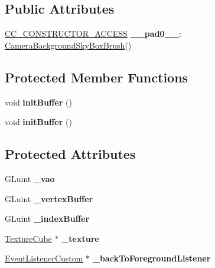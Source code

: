 \subsection*{Public Attributes}
\begin{DoxyCompactItemize}
\item 
\mbox{\label{classCameraBackgroundSkyBoxBrush_a05aff0d9ce05cd735e4830a7f6384987}} 
\hyperlink{_2cocos2d_2cocos_2base_2ccConfig_8h_a25ef1314f97c35a2ed3d029b0ead6da0}{C\+C\+\_\+\+C\+O\+N\+S\+T\+R\+U\+C\+T\+O\+R\+\_\+\+A\+C\+C\+E\+SS} {\bfseries \+\_\+\+\_\+pad0\+\_\+\+\_\+}\+: \hyperlink{classCameraBackgroundSkyBoxBrush}{Camera\+Background\+Sky\+Box\+Brush}()
\end{DoxyCompactItemize}
\subsection*{Protected Member Functions}
\begin{DoxyCompactItemize}
\item 
\mbox{\label{classCameraBackgroundSkyBoxBrush_a511edcf40b17ff476a9d5525ffa192a5}} 
void {\bfseries init\+Buffer} ()
\item 
\mbox{\label{classCameraBackgroundSkyBoxBrush_a511edcf40b17ff476a9d5525ffa192a5}} 
void {\bfseries init\+Buffer} ()
\end{DoxyCompactItemize}
\subsection*{Protected Attributes}
\begin{DoxyCompactItemize}
\item 
\mbox{\label{classCameraBackgroundSkyBoxBrush_a05c4dc37f46718e1921dd33bbfbd43d7}} 
G\+Luint {\bfseries \+\_\+vao}
\item 
\mbox{\label{classCameraBackgroundSkyBoxBrush_ad2d18c4008c93614dddd7a65eba7398c}} 
G\+Luint {\bfseries \+\_\+vertex\+Buffer}
\item 
\mbox{\label{classCameraBackgroundSkyBoxBrush_a1ad25fceebee58b12d8b0d83939df0c9}} 
G\+Luint {\bfseries \+\_\+index\+Buffer}
\item 
\mbox{\label{classCameraBackgroundSkyBoxBrush_a285d8e0585b3f9a8ae85a59a43516b62}} 
\hyperlink{classTextureCube}{Texture\+Cube} $\ast$ {\bfseries \+\_\+texture}
\item 
\mbox{\label{classCameraBackgroundSkyBoxBrush_a0adeabe2fc633f77cf3510c094d64d93}} 
\hyperlink{classEventListenerCustom}{Event\+Listener\+Custom} $\ast$ {\bfseries \+\_\+back\+To\+Foreground\+Listener}
\end{DoxyCompactItemize}
